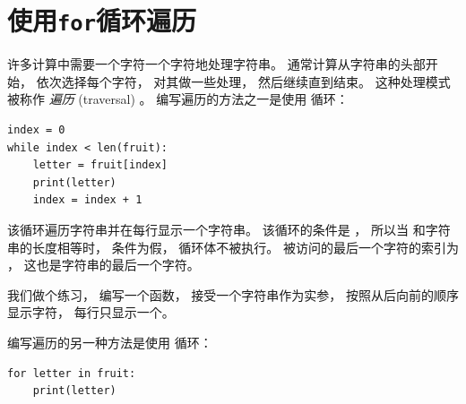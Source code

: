 \section{使用{\tt for}循环遍历}
\label{for}
  
  

  
  


许多计算中需要一个字符一个字符地处理字符串。  通常计算从字符串的头部开始， 依次选择每个字符， 对其做一些处理，
然后继续直到结束。  这种处理模式被称作 {\em 遍历} (traversal) 。  编写遍历的方法之一是使用  循环：


\begin{lstlisting}
index = 0
while index < len(fruit):
    letter = fruit[index]
    print(letter)
    index = index + 1
\end{lstlisting}

%

该循环遍历字符串并在每行显示一个字符串。  该循环的条件是 ， 所以当  和字符串的长度相等时， 条件为假， 循环体不被执行。  被访问的最后一个字符的索引为 ， 这也是字符串的最后一个字符。


我们做个练习， 编写一个函数， 接受一个字符串作为实参，
按照从后向前的顺序显示字符， 每行只显示一个。


编写遍历的另一种方法是使用  循环：

\begin{lstlisting}
for letter in fruit:
    print(letter)
\end{lstlisting}

